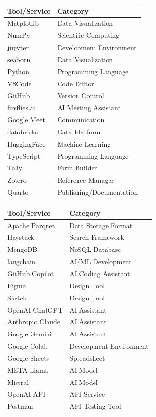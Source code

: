 \documentclass[
  letterpaper,
  DIV=11,
  numbers=noendperiod]{scrartcl}
\begin{document}
\begin{longtable}[]{@{}ll@{}}
\toprule\noalign{}
Tool/Service & Category \\
\midrule\noalign{}
\endhead
\bottomrule\noalign{}
\endlastfoot
Matplotlib & Data Visualization \\
NumPy & Scientific Computing \\
jupyter & Development Environment \\
seaborn & Data Visualization \\
Python & Programming Language \\
VSCode & Code Editor \\
GitHub & Version Control \\
fireflies.ai & AI Meeting Assistant \\
Google Meet & Communication \\
databricks & Data Platform \\
HuggingFace & Machine Learning \\
TypeScript & Programming Language \\
Tally & Form Builder \\
Zotero & Reference Manager \\
Quarto & Publishing/Documentation \\
\end{longtable}

\begin{longtable}[]{@{}ll@{}}
\toprule\noalign{}
Tool/Service & Category \\
\midrule\noalign{}
\endhead
\bottomrule\noalign{}
\endlastfoot
Apache Parquet & Data Storage Format \\
Haystack & Search Framework \\
MongoDB & NoSQL Database \\
langchain & AI/ML Development \\
GitHub Copilot & AI Coding Assistant \\
Figma & Design Tool \\
Sketch & Design Tool \\
OpenAI ChatGPT & AI Assistant \\
Anthropic Claude & AI Assistant \\
Google Gemini & AI Assistant \\
Google Colab & Development Environment \\
Google Sheets & Spreadsheet \\
META Llama & AI Model \\
Mistral & AI Model \\
OpenAI API & API Service \\
Postman & API Testing Tool \\
\end{longtable}
\end{document}
